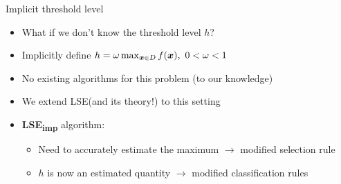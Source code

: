 \documentclass[10pt,mathserif]{beamer}
\newcommand{\acl}{\textsf{LSE}\xspace}
\newcommand{\iacl}{\textsf{LSE\textsubscript{imp}}\xspace}
\begin{document}
\begin{frame}
\begin{center}
\large Implicit threshold level
\end{center}
\begin{itemize}
\item<1-> What if we don't know the threshold level $h$?
\vspace{1em}
\item<2-> Implicitly define $h = \omega \max_{\bm{x}\in D} f(\bm{x}),\ 0 < \omega < 1$
\vspace{1em}
\item<3-> No existing algorithms for this problem (to our knowledge)
\vspace{1em}
\item<4-> We extend \acl (and its theory!) to this setting
\vspace{1em}
\item<5->\textbf{\iacl} algorithm:
\begin{itemize}
\item<6-> Need to accurately estimate the maximum $\rightarrow$ modified selection rule
\item<7-> $h$ is now an estimated quantity $\rightarrow$ modified classification rules
\end{itemize}
\end{itemize}
\begin{center}
\end{center}
\end{frame}
\end{document}
